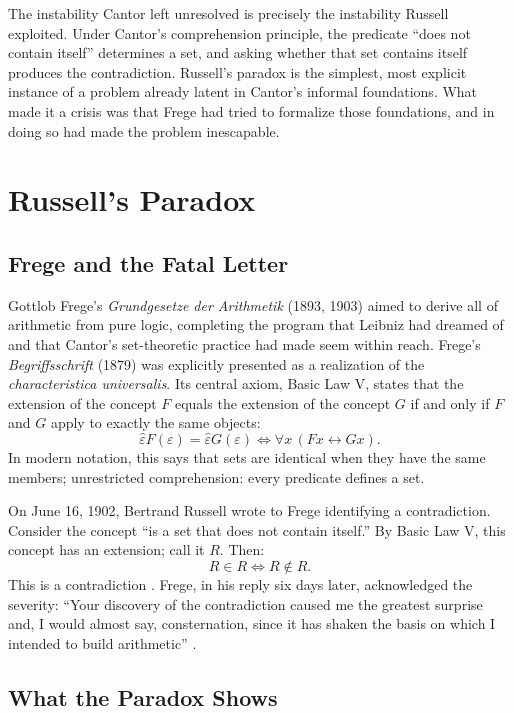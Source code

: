 \documentclass[12pt]{article}
\theoremstyle{definition}
\begin{document}
The instability Cantor left unresolved is precisely the instability Russell exploited. Under Cantor's comprehension principle, the predicate ``does not contain itself'' determines a set, and asking whether that set contains itself produces the contradiction. Russell's paradox is the simplest, most explicit instance of a problem already latent in Cantor's informal foundations. What made it a crisis was that Frege had tried to formalize those foundations, and in doing so had made the problem inescapable.

\section{Russell's Paradox}

\subsection{Frege and the Fatal Letter}

Gottlob Frege's \emph{Grundgesetze der Arithmetik} (1893, 1903) aimed to derive all of arithmetic from pure logic, completing the program that Leibniz had dreamed of and that Cantor's set-theoretic practice had made seem within reach. Frege's \emph{Begriffsschrift} (1879) was explicitly presented as a realization of the \emph{characteristica universalis}. Its central axiom, Basic Law V, states that the extension of the concept $F$ equals the extension of the concept $G$ if and only if $F$ and $G$ apply to exactly the same objects:
\[
\hat{\varepsilon}F(\varepsilon) = \hat{\varepsilon}G(\varepsilon) \iff \forall x\,(Fx \leftrightarrow Gx).
\]
In modern notation, this says that sets are identical when they have the same members; unrestricted comprehension: every predicate defines a set.

On June 16, 1902, Bertrand Russell wrote to Frege identifying a contradiction. Consider the concept ``is a set that does not contain itself.'' By Basic Law V, this concept has an extension; call it $R$. Then:
\[
R \in R \iff R \notin R.
\]
This is a contradiction \cite{russell_letter}. Frege, in his reply six days later, acknowledged the severity: ``Your discovery of the contradiction caused me the greatest surprise and, I would almost say, consternation, since it has shaken the basis on which I intended to build arithmetic'' \cite{frege_reply}.

\subsection{What the Paradox Shows}
\end{document}
